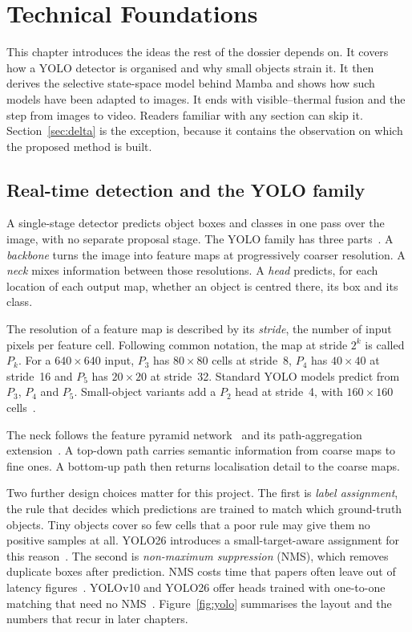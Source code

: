 \chapter{Technical Foundations}
\label{ch:foundations}

This chapter introduces the ideas the rest of the dossier depends on. It
covers how a YOLO detector is organised and why small objects strain it. It
then derives the selective state-space model behind Mamba and shows how such
models have been adapted to images. It ends with visible--thermal fusion and
the step from images to video. Readers familiar with any section can skip
it. Section~\ref{sec:delta} is the exception, because it contains the
observation on which the proposed method is built.

\section{Real-time detection and the YOLO family}
\label{sec:yolo}

A single-stage detector predicts object boxes and classes in one pass over
the image, with no separate proposal stage. The YOLO family has three
parts~\citep{wang2024yolov10,tian2025yolov12,yolo26_2026}. A
\emph{backbone} turns the image into feature maps at progressively coarser
resolution. A \emph{neck} mixes information between those resolutions. A
\emph{head} predicts, for each location of each output map, whether an
object is centred there, its box and its class.

The resolution of a feature map is described by its \emph{stride}, the
number of input pixels per feature cell. Following common notation, the map
at stride $2^k$ is called $P_k$. For a $640\times640$ input, $P_3$ has
$80\times80$ cells at stride~8, $P_4$ has $40\times40$ at stride~16 and $P_5$
has $20\times20$ at stride~32. Standard YOLO models predict from $P_3$, $P_4$
and $P_5$. Small-object variants add a $P_2$ head at stride~4, with
$160\times160$ cells~\citep{zhu2021tph,yang2026uavdet}.

The neck follows the feature pyramid network~\citep{lin2017fpn} and its
path-aggregation extension~\citep{liu2018panet}. A top-down path carries
semantic information from coarse maps to fine ones. A bottom-up path then
returns localisation detail to the coarse maps.

Two further design choices matter for this project. The first is
\emph{label assignment}, the rule that decides which predictions are trained
to match which ground-truth objects. Tiny objects cover so few cells that a
poor rule may give them no positive samples at all. YOLO26 introduces a
small-target-aware assignment for this reason~\citep{yolo26_2026}. The second
is \emph{non-maximum suppression} (NMS), which removes duplicate boxes after
prediction. NMS costs time that papers often leave out of latency
figures~\citep{robinson2025rfdetr}. YOLOv10 and YOLO26 offer heads trained
with one-to-one matching that need no NMS~\citep{wang2024yolov10,yolo26_2026}.
Figure~\ref{fig:yolo} summarises the layout and the numbers that recur in
later chapters.


